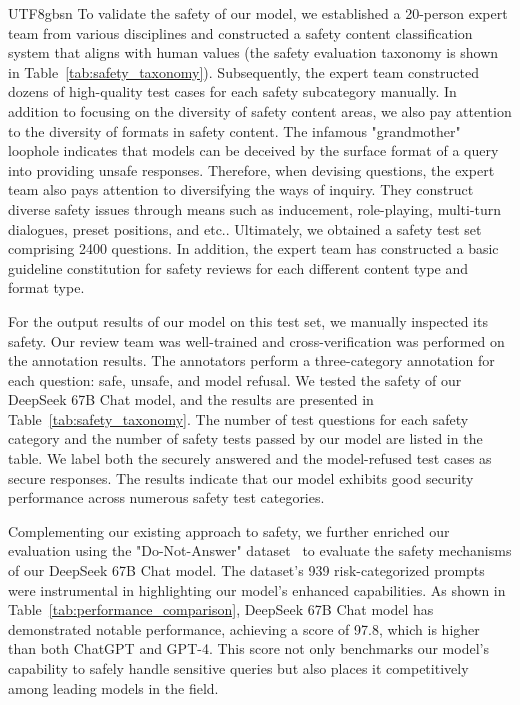 \documentclass[11pt, a4paper, logo, copyright, nonumbering]{deepseek}
\begin{document}
\begin{CJK*}{UTF8}{gbsn}
To validate the safety of our model, we established a 20-person expert team from various disciplines and constructed a safety content classification system that aligns with human values (the safety evaluation taxonomy is shown in Table~\ref{tab:safety_taxonomy}). Subsequently, the expert team constructed dozens of high-quality test cases for each safety subcategory manually.
In addition to focusing on the diversity of safety content areas, we also pay attention to the diversity of formats in safety content. The infamous "grandmother" loophole indicates that models can be deceived by the surface format of a query into providing unsafe responses.
Therefore, when devising questions, the expert team also pays attention to diversifying the ways of inquiry. They construct diverse safety issues through means such as inducement, role-playing, multi-turn dialogues, preset positions, and etc..
Ultimately, we obtained a safety test set comprising 2400 questions. In addition, the expert team has constructed a basic guideline constitution for safety reviews for each different content type and format type.

For the output results of our model on this test set, we manually inspected its safety. Our review team was well-trained and cross-verification was performed on the annotation results.
The annotators perform a three-category annotation for each question: safe, unsafe, and model refusal. We tested the safety of our DeepSeek 67B Chat model, and the results are presented in Table~\ref{tab:safety_taxonomy}. 
The number of test questions for each safety category and the number of safety tests passed by our model are listed in the table. We label both the securely answered and the model-refused test cases as secure responses. The results indicate that our model exhibits good security performance across numerous safety test categories.

Complementing our existing approach to safety, we further enriched our evaluation using the "Do-Not-Answer" dataset~\citep{donotanswer} to evaluate the safety mechanisms of our DeepSeek 67B Chat model. The dataset's 939 risk-categorized prompts were instrumental in highlighting our model's enhanced capabilities. As shown in Table~\ref{tab:performance_comparison}, DeepSeek 67B Chat model has demonstrated notable performance, achieving a score of 97.8, which is higher than both ChatGPT and GPT-4. This score not only benchmarks our model's capability to safely handle sensitive queries but also places it competitively among leading models in the field. 


\end{CJK*}
\end{document}
